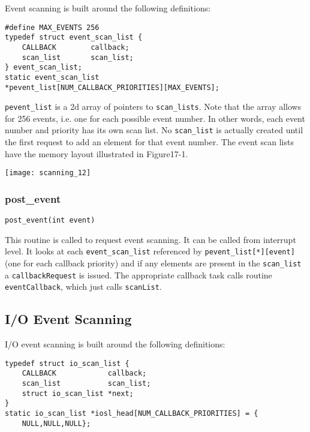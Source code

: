 Event scanning is built around the following definitions:

\begin{verbatim}
#define MAX_EVENTS 256
typedef struct event_scan_list {
    CALLBACK        callback;
    scan_list       scan_list;
} event_scan_list;
static event_scan_list
*pevent_list[NUM_CALLBACK_PRIORITIES][MAX_EVENTS];
\end{verbatim}

\verb|pevent_list| is a 2d array of pointers to \verb|scan_lists|. Note that the array allows for 256 events, i.e. one for each 
possible event number. In other words, each event number and priority has its own scan list. No \verb|scan_list| is actually 
created until the first request to add an element for that event number. The event scan lists have the memory layout 
illustrated in Figure17-1.

\begin{center}
\texttt{[image: scanning\_12]}
\end{center}

\subsubsection{post\_event} 

\begin{verbatim}
post_event(int event)
\end{verbatim}

This routine is called to request  event scanning. It can be called from interrupt level. It looks at each 
\verb|event_scan_list| referenced by \verb|pevent_list[*][event]| (one for each callback priority) and if any elements are 
present in the \verb|scan_list| a \verb|callbackRequest| is issued. The appropriate callback task calls routine 
\verb|eventCallback|, which just calls \verb|scanList|. 

\subsection{I/O Event Scanning}

I/O event scanning is built around the following definitions:

\begin{verbatim}
typedef struct io_scan_list {
    CALLBACK            callback;
    scan_list           scan_list;
    struct io_scan_list *next;
}
static io_scan_list *iosl_head[NUM_CALLBACK_PRIORITIES] = {
    NULL,NULL,NULL};
\end{verbatim}

